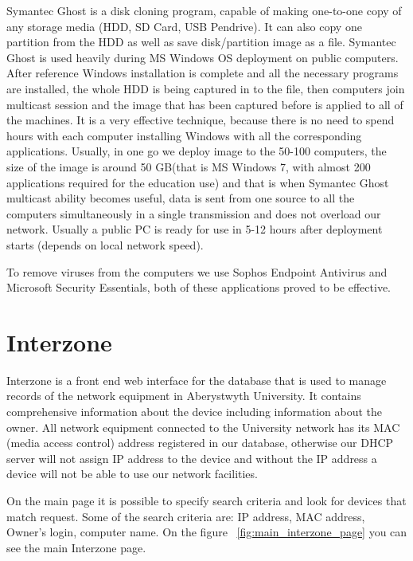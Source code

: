 \documentclass[10pt,a4paper,headinclude=true,twoside]{report}
\begin{document}
Symantec Ghost is a disk cloning program, capable of making one-to-one copy of any storage media (HDD, SD Card, USB Pendrive). It can also copy one partition from the HDD as well as save disk/partition image as a file. Symantec Ghost is used heavily during MS Windows OS deployment on public computers. After reference Windows installation is complete and all the necessary programs are installed, the whole HDD is being captured in to the file, then computers join multicast session and the image  that has been captured before is applied to all of the machines. It is a very effective technique, because there is no need to spend hours with each computer installing Windows with all the corresponding applications. Usually, in one go we deploy image to the 50-100 computers, the size of the image is around 50 GB(that is MS Windows 7, with almost 200 applications required for the education use) and that is when Symantec Ghost multicast ability becomes useful, data is sent from one source to all the computers simultaneously in a single transmission and does not overload our network. Usually a public PC is ready for use in 5-12 hours after deployment starts (depends on local network speed).

To remove viruses from the computers we use Sophos Endpoint Antivirus and Microsoft Security Essentials, both of these applications proved to be effective.
 
\section{Interzone}
Interzone is a front end web interface for the database that is used to manage records of the network equipment in Aberystwyth University. It contains comprehensive information about the device including information about the owner. All network equipment connected to the University network has its MAC (media access control) address registered in our database, otherwise our DHCP server will not assign IP address to the device and without the IP address a device will not be able to use our network facilities.

On the main page it is possible to specify search criteria and look for devices that match request. Some of the search criteria are: IP address, MAC address, Owner's login, computer name. On the figure ~\ref{fig:main_interzone_page} you can see the main Interzone page.
\end{document}
